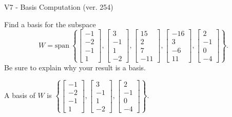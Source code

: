 \begin{exercise}
  \begin{exerciseTitle}V7 - Basis Computation (ver. 254)\end{exerciseTitle}
  \begin{exerciseStatement}
    Find a basis for the subspace 
\[W=\mathrm{span}\ \left\{\left[\begin{array}{r}
-1 \\
-2 \\
-1 \\
1
\end{array}\right] , \left[\begin{array}{r}
3 \\
-1 \\
1 \\
-2
\end{array}\right] , \left[\begin{array}{r}
15 \\
2 \\
7 \\
-11
\end{array}\right] , \left[\begin{array}{r}
-16 \\
3 \\
-6 \\
11
\end{array}\right] , \left[\begin{array}{r}
2 \\
-1 \\
0 \\
-4
\end{array}\right]\right\}.\]
 Be sure to explain why your result is a basis.


  \end{exerciseStatement}
  \begin{exerciseAnswer}
   A basis of \(W\) is  \(\left\{\left[\begin{array}{r}
-1 \\
-2 \\
-1 \\
1
\end{array}\right] , \left[\begin{array}{r}
3 \\
-1 \\
1 \\
-2
\end{array}\right] , \left[\begin{array}{r}
2 \\
-1 \\
0 \\
-4
\end{array}\right]\right\}\).
  


  \end{exerciseAnswer}
\end{exercise}